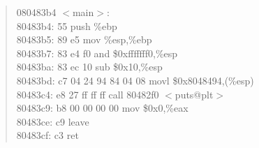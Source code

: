 \documentclass[10pt,a4paper]{article}
\begin{document}
\begin{quote}
080483b4 $<$main$>$:\\
80483b4: \hspace{0.25cm} 55 \hspace{0.25cm} push   \%ebp\\
 80483b5: \hspace{0.25cm} 89 e5 \hspace{0.25cm} mov    \%esp,\%ebp\\
 80483b7: \hspace{0.25cm} 83 e4 f0             	\hspace{0.25cm}and    \$0xfffffff0,\%esp\\
 80483ba: \hspace{0.25cm} 83 ec 10             	\hspace{0.25cm}sub    \$0x10,\%esp\\
 80483bd: \hspace{0.25cm} c7 04 24 94 84 04 08 	\hspace{0.25cm}movl   \$0x8048494,(\%esp)\\
 80483c4: \hspace{0.25cm} e8 27 ff ff ff       	\hspace{0.25cm}call   80482f0 $<$puts@plt$>$\\
 80483c9: \hspace{0.25cm} b8 00 00 00 00       	\hspace{0.25cm}mov    \$0x0,\%eax\\
 80483ce: \hspace{0.25cm} c9                   	\hspace{0.25cm}leave \\ 
 80483cf: \hspace{0.25cm} c3                   	\hspace{0.25cm}ret\\  
\end{quote}
\end{document}
